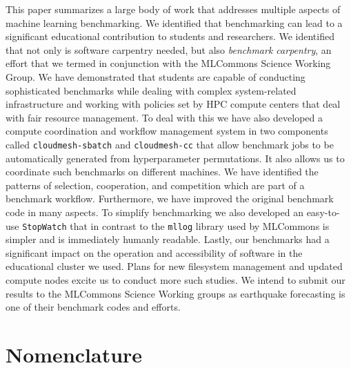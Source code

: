 \documentclass[utf8]{FrontiersinVancouver} %
\newcommand{\TODO}[2]{\todo[inline]{{\bf \color{red} #1} #2}}
\begin{document}
This paper summarizes a large body of work that addresses multiple aspects of machine learning benchmarking. We identified that benchmarking can lead to a significant educational contribution to students and researchers. We identified that not only is software carpentry needed, but also {\em benchmark carpentry}, an effort that we termed in conjunction with the MLCommons Science Working Group. We have demonstrated that students are capable of conducting sophisticated benchmarks while dealing with complex system-related infrastructure and working with policies set by HPC compute centers that deal with fair resource management. To deal with this we have also developed a compute coordination and workflow management system in two components called \verb|cloudmesh-sbatch| and \verb|cloudmesh-cc| that allow benchmark jobs to be automatically generated from hyperparameter permutations. It also allows us to coordinate such benchmarks on different machines. We have identified the patterns of selection, cooperation, and competition which are part of a benchmark workflow. Furthermore, we have improved the original benchmark code in many aspects. To simplify benchmarking we also developed an easy-to-use \verb|StopWatch| that in contrast to the \verb|mllog| library used by MLCommons is simpler and is immediately humanly readable. Lastly, our benchmarks had a significant impact on the operation and accessibility of software in the educational cluster we used. Plans for new filesystem management and updated compute nodes excite us to conduct more such studies. We intend to submit our results to the MLCommons Science Working groups as earthquake forecasting is one of their benchmark codes and efforts.

\clearpage

\section{Nomenclature}
\end{document}
